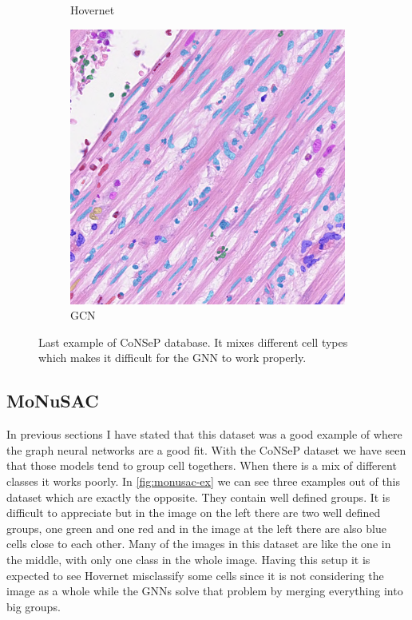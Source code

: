 \begin{figure}[H]
\begin{subfigure}[b]{0.3\textwidth}
    \caption{Hovernet}
  \end{subfigure}
  \begin{subfigure}[b]{0.3\textwidth}
    \includegraphics[width=\textwidth]{imgs/qual/consep/gcn-full3.png}
    \caption{GCN}
  \end{subfigure}
    \caption{Last example of CoNSeP database. It mixes different cell types which makes it difficult for the GNN to work properly.}
    \label{fig:consep-qual3}
\end{figure}

\newpage
\subsection{MoNuSAC}

In previous sections I have stated that this dataset was a good example of where the graph neural networks are a good fit. With the CoNSeP dataset we have seen that those models tend to group cell togethers. When there is a mix of different classes it works poorly. In \autoref{fig:monusac-ex} we can see three examples out of this dataset which are exactly the opposite. They contain well defined groups. It is difficult to appreciate but in the image on the left there are two well defined groups, one green and one red and in the image at the left there are also blue cells close to each other. Many of the images in this dataset are like the one in the middle, with only one class in the whole image. Having this setup it is expected to see Hovernet misclassify some cells since it is not considering the image as a whole while the GNNs solve that problem by merging everything into big groups.

